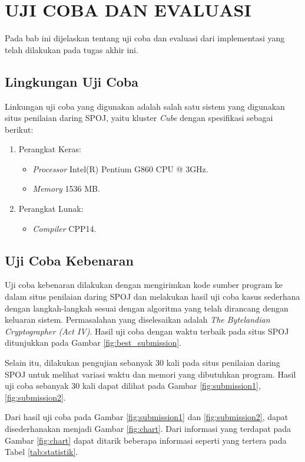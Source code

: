 \chapter{UJI COBA DAN EVALUASI}

Pada bab ini dijelaskan tentang uji coba dan evaluasi dari implementasi yang telah dilakukan pada tugas akhir ini.

\section{Lingkungan Uji Coba}

Linkungan uji coba yang digunakan adalah salah satu sistem yang digunakan situs penilaian daring SPOJ, yaitu kluster \textit{Cube} dengan spesifikasi sebagai berikut:

\begin{enumerate}
	\item Perangkat Keras:
	\begin{itemize}
		\item \textit{Processor} Intel(R) Pentium G860 CPU @ 3GHz.
		\item \textit{Memory} 1536 MB.
	\end{itemize}
	\item Perangkat Lunak:
	\begin{itemize}
		\item \textit{Compiler} CPP14.
	\end{itemize}			
\end{enumerate} 

\section{Uji Coba Kebenaran}

Uji coba kebenaran dilakukan dengan mengirimkan kode sumber program ke dalam situs penilaian daring SPOJ dan melakukan hasil uji coba kasus sederhana dengan langkah-langkah sesuai dengan algoritma yang telah dirancang dengan keluaran sistem. Permasalahan yang diselesaikan adalah \textit{The Bytelandian Cryptographer (Act IV)}. Hasil uji coba dengan waktu terbaik pada situs SPOJ ditunjukkan pada Gambar \ref{fig:best_submission}.

Selain itu, dilakukan pengujian sebanyak 30 kali pada situs penilaian daring SPOJ untuk melihat variasi waktu dan memori  yang dibutuhkan program. Hasil uji coba sebanyak 30 kali dapat dilihat pada Gambar \ref{fig:submission1}, \ref{fig:submission2}.

Dari hasil uji coba pada Gambar \ref{fig:submission1} dan \ref{fig:submission2}, dapat disederhanakan menjadi Gambar \ref{fig:chart}. Dari informasi yang terdapat pada Gambar \ref{fig:chart} dapat ditarik beberapa informasi seperti yang tertera pada Tabel \ref{tab:statistik}.

